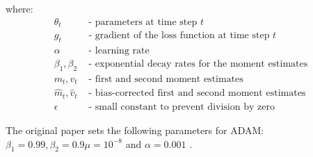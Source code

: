 where:
\begin{align*}
    \theta_t & \text{ - parameters at time step } t \\
    g_t & \text{ - gradient of the loss function at time step } t \\
    \alpha & \text{ - learning rate} \\
    \beta_1, \beta_2 & \text{ - exponential decay rates for the moment estimates} \\
    m_t, v_t & \text{ - first and second moment estimates} \\
    \hat{m}_t, \hat{v}_t & \text{ - bias-corrected first and second moment estimates} \\
    \epsilon & \text{ - small constant to prevent division by zero}
\end{align*}

The original paper sets the following parameters for ADAM: $\beta_1 = 0.99, \beta_2 = 0.9 \mu=10^{-8}$ and $\alpha = 0.001$ \cite{kingma2017adam}.